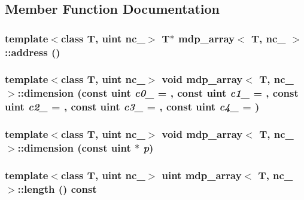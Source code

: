 \subsection{Member Function Documentation}
\hypertarget{classmdp__array_a9b5419e65691954be0a3b6598a47366a}{
\subsubsection[{address}]{\setlength{\rightskip}{0pt plus 5cm}template$<$class T, uint nc\_\-$>$ T$\ast$ {\bf mdp\_\-array}$<$ T, nc\_\- $>$::address ()}}
\label{classmdp__array_a9b5419e65691954be0a3b6598a47366a}
\hypertarget{classmdp__array_a816b392dd8ab232c18818e6f186127aa}{
\subsubsection[{dimension}]{\setlength{\rightskip}{0pt plus 5cm}template$<$class T, uint nc\_\-$>$ void {\bf mdp\_\-array}$<$ T, nc\_\- $>$::dimension (const {\bf uint} {\em c0\_\-} = {}, \/  const {\bf uint} {\em c1\_\-} = {}, \/  const {\bf uint} {\em c2\_\-} = {}, \/  const {\bf uint} {\em c3\_\-} = {}, \/  const {\bf uint} {\em c4\_\-} = {})}}
\label{classmdp__array_a816b392dd8ab232c18818e6f186127aa}
\hypertarget{classmdp__array_a6a3d01021b01c27ea0a0cf43dd442ad5}{
\subsubsection[{dimension}]{\setlength{\rightskip}{0pt plus 5cm}template$<$class T, uint nc\_\-$>$ void {\bf mdp\_\-array}$<$ T, nc\_\- $>$::dimension (const {\bf uint} $\ast$ {\em p})}}
\label{classmdp__array_a6a3d01021b01c27ea0a0cf43dd442ad5}
\hypertarget{classmdp__array_a5e8cd60cd274b3a0e9835b66c6d430e6}{
\subsubsection[{length}]{\setlength{\rightskip}{0pt plus 5cm}template$<$class T, uint nc\_\-$>$ {\bf uint} {\bf mdp\_\-array}$<$ T, nc\_\- $>$::length () const}}
